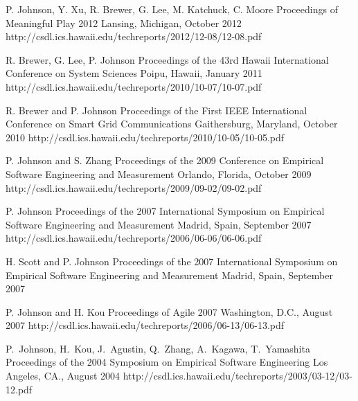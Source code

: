 \documentclass[11pt,letterpaper,sans]{moderncv} %
\begin{document}
          {P. Johnson, Y. Xu, R. Brewer, G. Lee, M. Katchuck, C. Moore}
          {Proceedings of Meaningful Play 2012}
          {Lansing, Michigan, October 2012}
          {http://csdl.ics.hawaii.edu/techreports/2012/12-08/12-08.pdf}

          {R. Brewer, G. Lee, P. Johnson}
          {Proceedings of the 43rd Hawaii International Conference on System Sciences}
          {Poipu, Hawaii, January 2011}
          {http://csdl.ics.hawaii.edu/techreports/2010/10-07/10-07.pdf}

          {R. Brewer and P. Johnson}
          {Proceedings of the First IEEE International Conference on Smart Grid Communications}
          {Gaithersburg, Maryland, October 2010}
          {http://csdl.ics.hawaii.edu/techreports/2010/10-05/10-05.pdf}

          {P. Johnson and S. Zhang}
          {Proceedings of the 2009 Conference on Empirical Software Engineering and Measurement}
          {Orlando, Florida, October 2009}
          {http://csdl.ics.hawaii.edu/techreports/2009/09-02/09-02.pdf}

          {P. Johnson}
          {Proceedings of the 2007 International Symposium on Empirical Software Engineering and Measurement}
          {Madrid, Spain, September 2007}
          {http://csdl.ics.hawaii.edu/techreports/2006/06-06/06-06.pdf}

          {H. Scott and P. Johnson}
          {Proceedings of the 2007 International Symposium on Empirical Software Engineering and Measurement}
          {Madrid, Spain, September 2007}

          {P. Johnson and H. Kou}
          {Proceedings of Agile 2007}
          {Washington, D.C., August 2007}
          {http://csdl.ics.hawaii.edu/techreports/2006/06-13/06-13.pdf}

          {P.~Johnson, H.~Kou, J.~Agustin, Q.~Zhang, A.~Kagawa, T.~Yamashita}
          {Proceedings of the 2004 Symposium on Empirical Software Engineering}
          {Los Angeles, CA., August 2004}
          {http://csdl.ics.hawaii.edu/techreports/2003/03-12/03-12.pdf}
\end{document}
